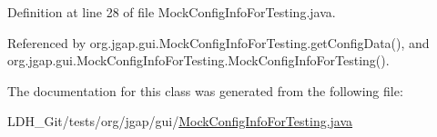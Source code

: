 Definition at line 28 of file Mock\-Config\-Info\-For\-Testing.\-java.



Referenced by org.\-jgap.\-gui.\-Mock\-Config\-Info\-For\-Testing.\-get\-Config\-Data(), and org.\-jgap.\-gui.\-Mock\-Config\-Info\-For\-Testing.\-Mock\-Config\-Info\-For\-Testing().



The documentation for this class was generated from the following file\-:\begin{DoxyCompactItemize}
\item 
L\-D\-H\-\_\-\-Git/tests/org/jgap/gui/\hyperlink{_mock_config_info_for_testing_8java}{Mock\-Config\-Info\-For\-Testing.\-java}\end{DoxyCompactItemize}
